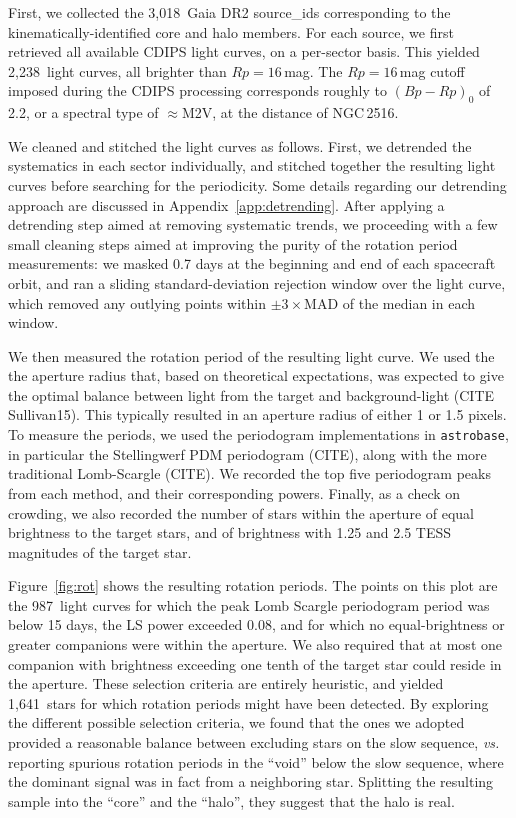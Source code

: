 \documentclass[12pt,twocolumn,tighten]{aastex63}
\newcommand{\nkinematic}{3{,}018\ } %
\newcommand{\ncdips}{2,238\ } %
\newcommand{\nautorotdenominator}{1{,}641\ } %
\newcommand{\nautorotnumerator}{987\ } %
\begin{document}
First, we collected the \nkinematic Gaia DR2 source\_ids corresponding to the
kinematically-identified core and halo members.  For each source, we first retrieved all
available CDIPS light curves, on a per-sector basis. 
This yielded
\ncdips light curves, all brighter than $Rp=16$\,mag.
The $Rp=16$\,mag cutoff imposed during the CDIPS processing corresponds
roughly to $(Bp-Rp)_0$ of 2.2, or a spectral type of $\approx$M2V, at
the distance of NGC\,2516.

We cleaned and stitched the light curves as follows.
First, we detrended the systematics in each sector individually, and
stitched together the resulting light curves before searching for the
periodicity.  Some details regarding our detrending approach are
discussed in Appendix~\ref{app:detrending}.  After applying a
detrending step aimed at removing systematic trends, we proceeding
with a few small cleaning steps aimed at improving the purity of the
rotation period measurements: we masked 0.7 days at the beginning and
end of each spacecraft orbit, and ran a sliding standard-deviation
rejection window over the light curve, which removed any outlying
points within $\pm3\times$MAD of the median in each window.

We then measured the rotation period of the resulting light curve.  We
used the the aperture radius that, based on theoretical expectations,
was expected to give the optimal balance between light from the target
and background-light (CITE Sullivan15).  This typically resulted in an
aperture radius of either 1 or 1.5 pixels.  To measure the periods, we
used the periodogram implementations in \texttt{astrobase}, in
particular the Stellingwerf PDM periodogram (CITE), along with the
more traditional Lomb-Scargle (CITE).  We recorded the top five
periodogram peaks from each method, and their corresponding powers.
Finally, as a check on crowding, we also recorded the number of stars
within the aperture of equal brightness to the target stars, and of
brightness with 1.25 and 2.5 TESS magnitudes of the target star.

Figure~\ref{fig:rot} shows the resulting rotation periods.  The points
on this plot are the \nautorotnumerator light curves for which the peak Lomb Scargle
periodogram period was below 15 days, the LS power exceeded 0.08, and
for which no equal-brightness or greater companions were within the aperture. 
We also required that at most one companion with brightness exceeding 
one tenth of the target star could reside in the aperture.
These
selection criteria are entirely heuristic, and yielded
\nautorotdenominator stars for which rotation periods might have been
detected.  
By exploring the different possible selection criteria, we found that
the ones we adopted provided a
reasonable balance between excluding stars on the slow sequence, {\it
vs.} reporting spurious rotation periods in the ``void'' below the
slow sequence, where the dominant signal was in fact from a
neighboring star.
Splitting the resulting sample into the ``core'' and the ``halo'', they
suggest that the halo is real.
\end{document}
